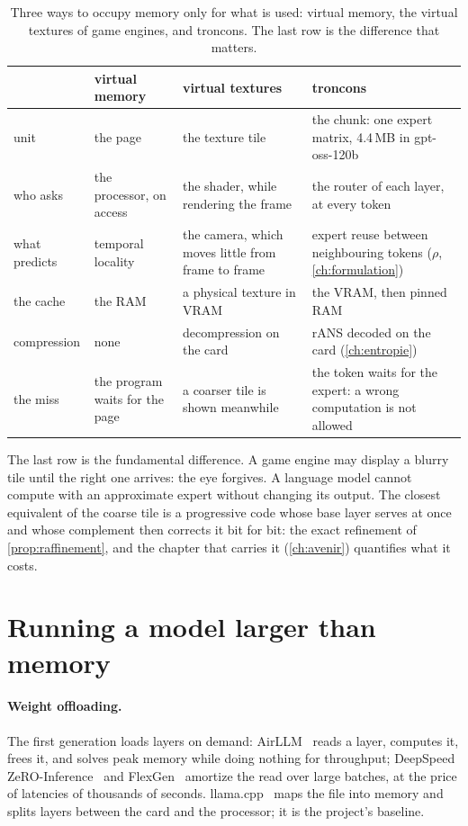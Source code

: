 \begin{table}[ht]
\centering\small
\caption[Three ways to occupy only what is used]{Three ways to occupy memory only for what is used: virtual memory, the virtual textures of game engines, and troncons. The last row is the difference that matters.}
\label{tab:analogie}
\begin{tabularx}{\linewidth}{@{}>{\raggedright}p{2.1cm}>{\raggedright}X>{\raggedright}X>{\raggedright\arraybackslash}X@{}}
\toprule
 & virtual memory & virtual textures & troncons \\
\midrule
unit & the page & the texture tile & the chunk: one expert matrix, 4.4\,MB in gpt-oss-120b \\
who asks & the processor, on access & the shader, while rendering the frame & the router of each layer, at every token \\
what predicts & temporal locality & the camera, which moves little from frame to frame & expert reuse between neighbouring tokens ($\rho$, \cref{ch:formulation}) \\
the cache & the RAM & a physical texture in VRAM & the VRAM, then pinned RAM \\
compression & none & decompression on the card & rANS decoded on the card (\cref{ch:entropie}) \\
the miss & the program waits for the page & a coarser tile is shown meanwhile & the token waits for the expert: a wrong computation is not allowed \\
\bottomrule
\end{tabularx}
\end{table}

The last row is the fundamental difference. A game engine may display a blurry tile until the right one arrives: the eye forgives. A language model cannot compute with an approximate expert without changing its output. The closest equivalent of the coarse tile is a progressive code whose base layer serves at once and whose complement then corrects it bit for bit: the exact refinement of \cref{prop:raffinement}, and the chapter that carries it (\cref{ch:avenir}) quantifies what it costs.

\section{Running a model larger than memory}\label{sec:etat-dechargement}

\paragraph{Weight offloading.} The first generation loads layers on demand: AirLLM~\cite{airllm2026} reads a layer, computes it, frees it, and solves peak memory while doing nothing for throughput; DeepSpeed ZeRO-Inference~\cite{zeroinference2022} and FlexGen~\cite{flexgen2023} amortize the read over large batches, at the price of latencies of thousands of seconds. llama.cpp~\cite{llamacpp} maps the file into memory and splits layers between the card and the processor; it is the project's baseline.


